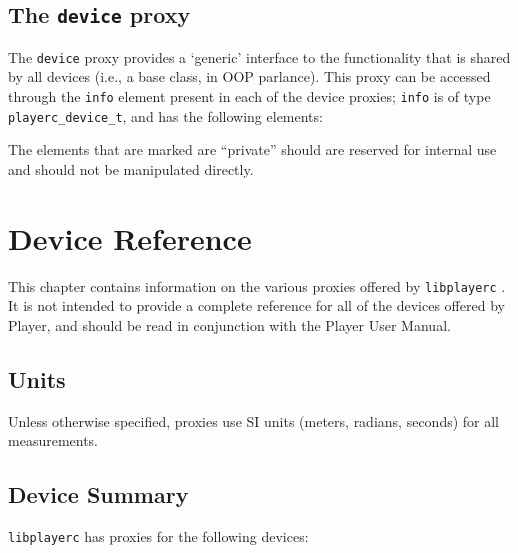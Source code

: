 \documentclass[11pt]{report}
\def\libplayerc {{\tt libplayerc} }
\begin{document}
\section{The {\tt device} proxy}

The {\tt device} proxy provides a `generic' interface to the
functionality that is shared by all devices (i.e., a base class, in
OOP parlance).  This proxy can be accessed through the {\tt info}
element present in each of the device proxies; {\tt info} is of type
{\tt playerc\_device\_t}, and has the following elements:
\begin{quote}

\end{quote}
The elements that are marked are ``private'' should are reserved for 
internal use and should not be manipulated directly.


\chapter{Device Reference}
\label{chap.devices}

This chapter contains information on the various proxies offered by
\libplayerc.  It is not intended to provide a complete reference for
all of the devices offered by Player, and should be read in
conjunction with the Player User Manual.

\section{Units}

Unless otherwise specified, proxies use SI units (meters, radians,
seconds) for all measurements.

\section{Device Summary}

\libplayerc has proxies for the following devices:
\end{document}

